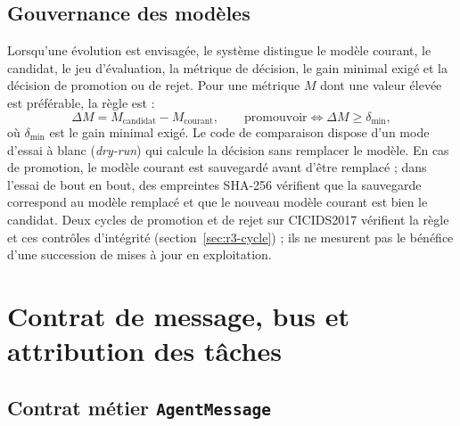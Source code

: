\subsection{Gouvernance des modèles}

Lorsqu'une évolution est envisagée, le système distingue le modèle courant, le candidat, le jeu d'évaluation, la métrique de décision, le gain minimal exigé et la décision de promotion ou de rejet. Pour une métrique $M$ dont une valeur élevée est préférable, la règle est :
\[
\Delta M = M_{\text{candidat}} - M_{\text{courant}}, \qquad
\text{promouvoir} \iff \Delta M \geq \delta_{\min},
\]
où $\delta_{\min}$ est le gain minimal exigé. Le code de comparaison dispose d'un mode d'essai à blanc (\textit{dry-run}) qui calcule la décision sans remplacer le modèle. En cas de promotion, le modèle courant est sauvegardé avant d'être remplacé ; dans l'essai de bout en bout, des empreintes SHA-256 vérifient que la sauvegarde correspond au modèle remplacé et que le nouveau modèle courant est bien le candidat. Deux cycles de promotion et de rejet sur CICIDS2017 vérifient la règle et ces contrôles d'intégrité (section~\ref{sec:r3-cycle}) ; ils ne mesurent pas le bénéfice d'une succession de mises à jour en exploitation.

\section{Contrat de message, bus et attribution des tâches}

\label{sec:contrat-bus}

\subsection{Contrat métier \texttt{AgentMessage}}

\label{sec:agentmessage}

